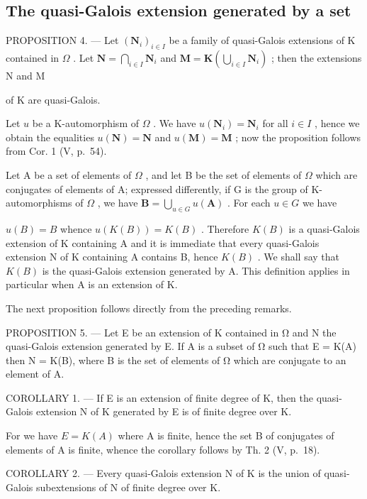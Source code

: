 \subsection{The quasi-Galois extension generated by a set}

PROPOSITION 4. --- Let \((\mathbf{N}_i)_{i\in I}\) be a family of quasi-Galois extensions of K contained in \(\Omega\) . Let \(\mathbf{N} = \bigcap_{i\in I}\mathbf{N}_i\) and \(\mathbf{M} = \mathbf{K}\left(\bigcup_{i\in I}\mathbf{N}_i\right)\) ; then the extensions N and M

of K are quasi-Galois.

Let \(u\) be a K-automorphism of \(\Omega\) . We have \(u(\mathbf{N}_i) = \mathbf{N}_i\) for all \(i \in I\) , hence we obtain the equalities \(u(\mathbf{N}) = \mathbf{N}\) and \(u(\mathbf{M}) = \mathbf{M}\) ; now the proposition follows from Cor. 1 (V, p.~54).

Let A be a set of elements of \(\Omega\) , and let B be the set of elements of \(\Omega\) which are conjugates of elements of A; expressed differently, if G is the group of K-automorphisms of \(\Omega\) , we have \(\mathbf{B} = \bigcup_{u \in G} u(\mathbf{A})\) . For each \(u \in G\) we have

\(u(B) = B\) whence \(u(K(B)) = K(B)\) . Therefore \(K(B)\) is a quasi-Galois extension of K containing A and it is immediate that every quasi-Galois extension N of K containing A contains B, hence \(K(B)\) . We shall say that \(K(B)\) is the quasi-Galois extension generated by A. This definition applies in particular when A is an extension of K.

The next proposition follows directly from the preceding remarks.

PROPOSITION 5. --- Let E be an extension of K contained in Ω and N the quasi-Galois extension generated by E. If A is a subset of Ω such that E = K(A) then N = K(B), where B is the set of elements of Ω which are conjugate to an element of A.

COROLLARY 1. --- If E is an extension of finite degree of K, then the quasi-Galois extension N of K generated by E is of finite degree over K.

For we have \(E = K(A)\) where A is finite, hence the set B of conjugates of elements of A is finite, whence the corollary follows by Th. 2 (V, p.~18).

COROLLARY 2. --- Every quasi-Galois extension N of K is the union of quasi-Galois subextensions of N of finite degree over K.

